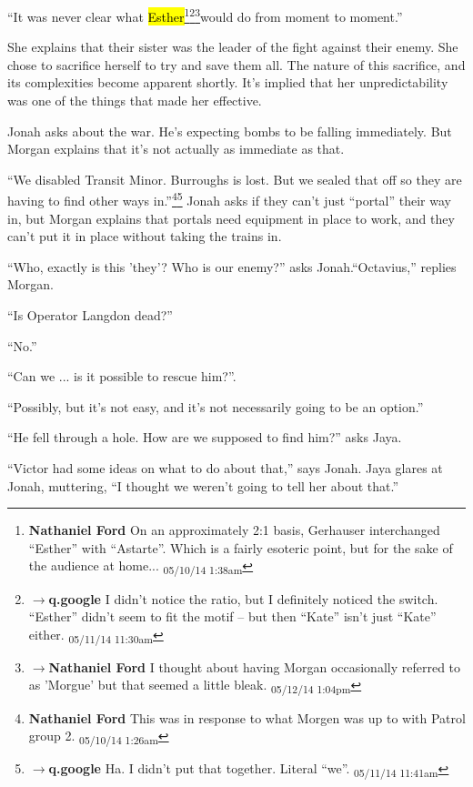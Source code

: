 ``It was never clear what \hl{Esther}\footnote{\textbf{Nathaniel Ford }On an approximately 2:1 basis, Gerhauser interchanged ``Esther'' with ``Astarte''. Which is a fairly esoteric point, but for the sake of the audience at home... \textsubscript{05/10/14 1:38am}}\footnote{$\rightarrow$\textbf{q.google }I didn't notice the ratio, but I definitely noticed the switch.  ``Esther'' didn't seem to fit the motif -- but then ``Kate'' isn't just ``Kate'' either. \textsubscript{05/11/14 11:30am}}\footnote{$\rightarrow$\textbf{Nathaniel Ford }I thought about having Morgan occasionally referred to as 'Morgue' but that seemed a little bleak. \textsubscript{05/12/14 1:04pm}}would do from moment to moment.''

She explains that their sister was the leader of the fight against their enemy.  She chose to sacrifice herself to try and save them all.  The nature of this sacrifice, and its complexities become apparent shortly.  It's implied that her unpredictability was one of the things that made her effective.

Jonah asks about the war.  He's expecting bombs to be falling immediately.  But Morgan explains that it's not actually as immediate as that. 

``We disabled Transit Minor.  Burroughs is lost.  But we sealed that off so they are having to find other ways in.''\footnote{\textbf{Nathaniel Ford }This was in response to what Morgen was up to with Patrol group 2. \textsubscript{05/10/14 1:26am}}\footnote{$\rightarrow$\textbf{q.google }Ha.  I didn't put that together.  Literal ``we''. \textsubscript{05/11/14 11:41am}}  Jonah asks if they can't just ``portal'' their way in, but Morgan explains that portals need equipment in place to work, and they can't put it in place without taking the trains in.

``Who, exactly is this 'they'?  Who is our enemy?'' asks Jonah.``Octavius,'' replies Morgan.

``Is Operator Langdon dead?'' 

``No.''

``Can we ... is it possible to rescue him?''.

``Possibly, but it's not easy, and it's not necessarily going to be an option.''

``He fell through a hole.  How are we supposed to find him?''  asks Jaya.

``Victor had some ideas on what to do about that,'' says Jonah. Jaya glares at Jonah, muttering, ``I thought we weren't going to tell her about that.''

